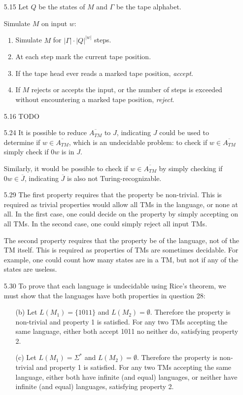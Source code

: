\documentclass{article}
\begin{document}
\begin{itemize}
    \item[5.15] Let $Q$ be the states of $M$ and $\Gamma$ be the tape alphabet.
    
    Simulate $M$ on input $w$:
    \begin{enumerate}
        \item Simulate $M$ for $|\Gamma| \cdot |Q|^{|w|}$ steps.
        \item At each step mark the current tape position.
        \item If the tape head ever reads a marked tape position, \textit{accept}.
        \item If $M$ rejects or accepts the input, or the number of steps is exceeded without encountering a marked tape
        position, \textit{reject}.
    \end{enumerate}

    \item[5.16] TODO
    
    \item[5.24] It is possible to reduce $\overline{A_{TM}}$ to $J$, indicating $J$ could be used to determine if $w \in
    \overline{A_{TM}}$, which is an undecidable problem:  to check if $w \in \overline{A_{TM}}$ simply check if $0w$ is
    in $J$.

    Similarly, it would be possible to check if $w \in \overline{A_{TM}}$ by simply checking if $0w \in \overline{J}$,
    indicating $\overline{J}$ is also not Turing-recognizable.

    \item[5.29] The first property requires that the property be non-trivial.  This is required as trivial properties
    would allow all TMs in the language, or none at all.  In the first case, one could decide on the property by simply
    accepting on all TMs.  In the second case, one could simply reject all input TMs.

    The second property requires that the property be of the language, not of the TM itself.  This is required as
    properties of TMs are sometimes decidable.  For example, one could count how many states are in a TM, but not if any
    of the states are useless.

    \item[5.30] To prove that each language is undecidable using Rice's theorem, we must show that the languages have
    both properties in question 28:
    \begin{itemize}
        \item[(b)] Let $L(M_1)=\{1011\}$ and $L(M_2)=\emptyset$.  Therefore the property is non-trivial and property 1
        is satisfied.  For any two TMs accepting the same language, either both accept 1011 no neither do, satisfying
        property 2.
        \item[(c)] Let $L(M_1)=\Sigma^*$ and $L(M_2)=\emptyset$.  Therefore the property is non-trivial and property 1
        is satisfied.  For any two TMs accepting the same language, either both have infinite (and equal) languages, or
        neither have infinite (and equal) languages, satisfying property 2.
    \end{itemize}


\end{itemize}
\end{document}

